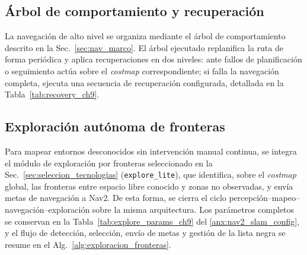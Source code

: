 \subsection{Árbol de comportamiento y recuperación}
\label{sec:bt_ch9}

La navegación de alto nivel se organiza mediante el árbol de comportamiento descrito en la Sec.~\ref{sec:nav_marco}.
El árbol ejecutado replanifica la ruta de forma periódica y aplica
recuperaciones en dos niveles: ante fallos de planificación o seguimiento
actúa sobre el \textit{costmap} correspondiente; si falla la navegación completa,
ejecuta una secuencia de recuperación configurada, detallada en la
Tabla~\ref{tab:recovery_ch9}.

\subsection{Exploración autónoma de fronteras}
\label{sec:explore_ch9}

Para mapear entornos desconocidos sin intervención manual continua, se integra el módulo de exploración por fronteras seleccionado en la Sec.~\ref{sec:seleccion_tecnologias} (\texttt{explore\_lite}), que identifica, sobre el \textit{costmap} global, las fronteras entre espacio libre conocido y zonas no observadas, y envía metas de navegación a Nav2. De esta forma, se cierra el ciclo percepción--mapeo--navegación--exploración sobre la misma arquitectura.
Los parámetros completos se conservan en la
Tabla~\ref{tab:explore_params_ch9} del \ref{anx:nav2_slam_config}, y el flujo
de detección, selección, envío de metas y gestión de la lista negra se resume
en el Alg.~\ref{alg:exploracion_fronteras}.

